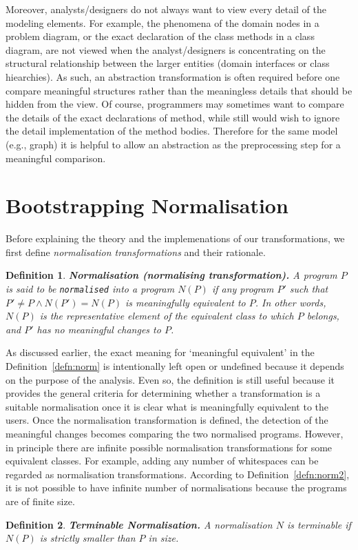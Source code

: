 \documentclass{acm_proc_article-sp}
\newtheorem{definition}{Definition}
\begin{document}
Moreover, analysts/designers do not always want to view every detail of the modeling elements. For example, the phenomena of the domain nodes in a problem diagram, or the exact declaration of the class methods in a class diagram, are not viewed when the analyst/designers is concentrating on the structural relationship between the larger entities (domain interfaces or class hiearchies). As such, an abstraction transformation is often required before one compare meaningful structures rather than the meaningless details that should be hidden from the view. Of course, programmers may sometimes want to compare the details of the exact declarations of method, while still would wish to ignore the detail implementation of the method bodies. Therefore for the same model (e.g., graph) it is helpful to allow an abstraction as the preprocessing step for a meaningful comparison.

\section{Bootstrapping Normalisation}\label{sec:approach}

Before explaining the theory and the implemenations of our transformations, we first define {\em normalisation transformations} and their rationale.
\begin{definition}
{\bf Normalisation (normalising transformation).\label{defn:norm}} A program $P$ is said to be {\tt normalised} into a program $N(P)$ if any program $P'$ such that $P'\neq P \wedge N(P') = N(P)$ is {\em meaningfully equivalent} to $P$. In other words, $N(P)$ is the representative element of the equivalent class to which $P$ belongs, and $P'$ has no meaningful changes to $P$.
\end{definition}
As discussed earlier, the exact meaning for `meaningful equivalent' in  the Definition~\ref{defn:norm} is intentionally left open or undefined because it depends on the purpose of the analysis. Even so, the definition is still useful because it provides the general criteria for determining whether a transformation is a suitable normalisation once it is clear what is meaningfully equivalent to the users. Once the normalisation transformation is defined, the detection of the meaningful changes becomes comparing the two normalised programs. However, in principle there are infinite possible normalisation transformations for some equivalent classes. For example, adding any number of whitespaces can be regarded as normalisation transformations. 
According to Definition~\ref{defn:norm2}, it is not possible to have infinite number of normalisations because the programs are of finite size.
\begin{definition}
{\bf Terminable Normalisation.\label{defn:norm2}} A normalisation $N$ is terminable if $N(P)$ is strictly smaller than $P$ in size.
\end{definition}
\end{document}

